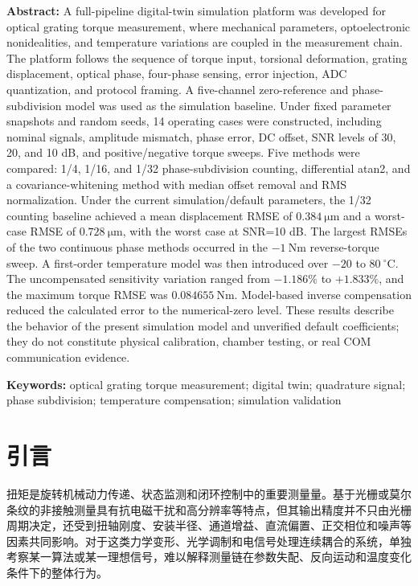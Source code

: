 \documentclass[UTF8,a4paper,12pt]{ctexart}
\newcommand{\enabstract}[1]{\noindent\textbf{Abstract: }#1\par}
\begin{document}
\enabstract{A full-pipeline digital-twin simulation platform was developed for optical grating torque measurement, where mechanical parameters, optoelectronic nonidealities, and temperature variations are coupled in the measurement chain. The platform follows the sequence of torque input, torsional deformation, grating displacement, optical phase, four-phase sensing, error injection, ADC quantization, and protocol framing. A five-channel zero-reference and phase-subdivision model was used as the simulation baseline. Under fixed parameter snapshots and random seeds, 14 operating cases were constructed, including nominal signals, amplitude mismatch, phase error, DC offset, SNR levels of 30, 20, and 10 dB, and positive/negative torque sweeps. Five methods were compared: 1/4, 1/16, and 1/32 phase-subdivision counting, differential atan2, and a covariance-whitening method with median offset removal and RMS normalization. Under the current simulation/default parameters, the 1/32 counting baseline achieved a mean displacement RMSE of $0.384~\si{\micro\metre}$ and a worst-case RMSE of $0.728~\si{\micro\metre}$, with the worst case at SNR=10 dB. The largest RMSEs of the two continuous phase methods occurred in the $-1~\si{\newton\metre}$ reverse-torque sweep. A first-order temperature model was then introduced over $-20$ to $80~^\circ\mathrm{C}$. The uncompensated sensitivity variation ranged from $-1.186\%$ to $+1.833\%$, and the maximum torque RMSE was $0.084655~\si{\newton\metre}$. Model-based inverse compensation reduced the calculated error to the numerical-zero level. These results describe the behavior of the present simulation model and unverified default coefficients; they do not constitute physical calibration, chamber testing, or real COM communication evidence.}

\vspace{0.4em}
\noindent\textbf{Keywords: }optical grating torque measurement; digital twin; quadrature signal; phase subdivision; temperature compensation; simulation validation

\section*{引言}

扭矩是旋转机械动力传递、状态监测和闭环控制中的重要测量量。基于光栅或莫尔条纹的非接触测量具有抗电磁干扰和高分辨率等特点，但其输出精度并不只由光栅周期决定，还受到扭轴刚度、安装半径、通道增益、直流偏置、正交相位和噪声等因素共同影响。对于这类力学变形、光学调制和电信号处理连续耦合的系统，单独考察某一算法或某一理想信号，难以解释测量链在参数失配、反向运动和温度变化条件下的整体行为。
\end{document}
